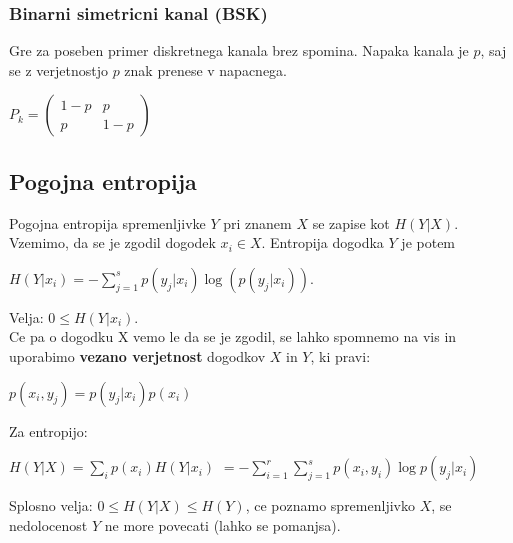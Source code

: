 \documentclass{article}
\begin{document}
\begin{multicols}{3}
\subsubsection{Binarni simetricni kanal (BSK)}
Gre za poseben primer diskretnega kanala brez spomina. Napaka kanala je $p$, saj se z verjetnostjo $p$ znak prenese
v napacnega.
\begin{center}
    \begin{math}
        P_k = 
                \begin{pmatrix}
                    1-p & p\\
                    p & 1-p 
                \end{pmatrix}
    \end{math}
\end{center}

\subsection{Pogojna entropija}
Pogojna entropija spremenljivke $Y$ pri znanem $X$ se zapise kot $H(Y|X)$.
Vzemimo, da se je zgodil dogodek $x_i \in X$. Entropija dogodka $Y$ je potem
\begin{center}
    \begin{math}
        H(Y|x_i) = - \sum_{j=1}^s p(y_j|x_i) \log(p(y_j| x_i)).
    \end{math}
\end{center}
Velja: $0 \leq H(Y| x_i)$.\\
Ce pa o dogodku X vemo le da se je zgodil, se lahko spomnemo na vis in uporabimo
\textbf{vezano verjetnost} dogodkov $X$ in $Y$, ki pravi:
\begin{center}
    \begin{math}
        p(x_i, y_j) = p(y_j|x_i)p(x_i)
    \end{math}
\end{center}
Za entropijo:
\begin{center}
    \begin{math}
        H(Y|X) = \sum_{i} p(x_i)H(Y|x_i)
    \end{math}
    \begin{math}
        = -\sum_{i=1}^r \sum_{j=1}^s p(x_i, y_i) \log p(y_j | x_i)
    \end{math}
\end{center}
Splosno velja: $0 \leq H(Y|X) \leq H(Y)$, ce poznamo spremenljivko $X$, se nedolocenost $Y$ ne more povecati (lahko se pomanjsa).


\end{multicols}
\end{document}
